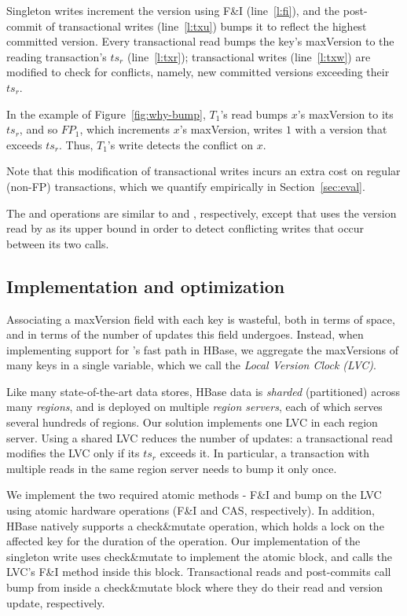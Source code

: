 Singleton writes  increment the version using F\&I  (line~\ref{l:fi}), and  
the post-commit of transactional writes  (line~\ref{l:txu}) bumps it 
to reflect the highest committed version.
Every transactional read bumps the key's {maxVersion}
to the reading transaction's $ts_r$  (line~\ref{l:txr}); 
transactional writes (line~\ref{l:txw}) are modified to check for conflicts, namely, 
new committed versions exceeding their $ts_r$.

In the example of Figure~\ref{fig:why-bump}, $T_1$'s read bumps $x$'s {maxVersion} to its $ts_r$, 
and so $FP_1$, which increments $x$'s maxVersion, writes $1$ with a version that exceeds $ts_r$.
Thus, $T_1$'s write  detects the conflict on $x$. 

 Note that this modification of transactional writes incurs an extra cost on
 regular (non-FP) transactions, which we quantify empirically in Section~\ref{sec:eval}.  

The  and  operations are  similar to  and , 
respectively, except that  uses the version read by  as its upper bound
in order to detect conflicting writes that occur between its two calls.

\subsection{Implementation and optimization}
\label{ssec:fast-impl}

Associating a maxVersion field with each key is wasteful,
both in terms of space, and in terms of the number of updates this field undergoes.
Instead, when implementing support for \sys's fast path in HBase, we aggregate the maxVersions of many keys in a single variable, 
which we call the \emph{Local Version Clock (LVC)}.

Like many state-of-the-art data stores, HBase data is \emph{sharded} (partitioned) 
across many \emph{regions}, and is deployed on multiple  \emph{region servers}, each of which serves
several hundreds of regions. Our solution implements one LVC in each region server. 
Using a shared LVC reduces the number of updates:  
a transactional read modifies the LVC only if its $ts_r$ exceeds it. In particular, 
a transaction with multiple reads in the same region server needs to bump it only once. 

We implement the two required atomic methods - F\&I and bump on the LVC using atomic hardware operations (F\&I and CAS, respectively). 
In addition, 
HBase   natively supports  a check\&mutate operation, which holds a lock on the affected key for the duration of the operation.
Our implementation of the singleton write uses  check\&mutate to implement the atomic block, and calls the LVC's F\&I method inside this block.
Transactional reads and post-commits call bump from inside a check\&mutate  block where they do their read and version update, respectively. 

